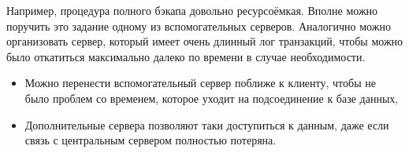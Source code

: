 Например, процедура полного бэкапа довольно ресурсоёмкая. Вполне можно поручить это задание одному из вспомогательных серверов. 
Аналогично можно организовать сервер, который имеет очень длинный лог транзакций, чтобы можно было откатиться максимально далеко 
по времени в случае необходимости. 
\begin{itemize}
\item Можно перенести вспомогательный сервер поближе к клиенту, чтобы не было проблем со временем, которое уходит на подсоединение 
к базе данных,
\item Дополнительные сервера позволяют таки доступиться к данным, даже если связь с центральным сервером полностью потеряна.
\end{itemize}